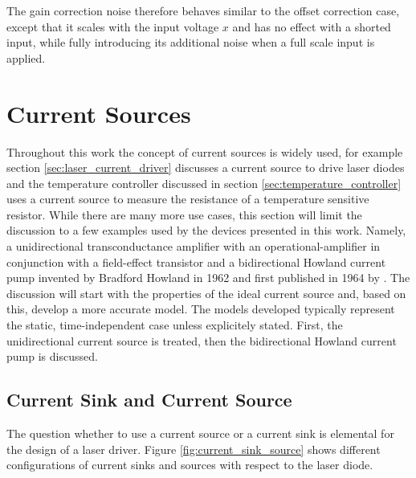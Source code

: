 The gain correction noise therefore behaves similar to the offset correction case, except that it scales with the input voltage $x$ and has no effect with a shorted input, while fully introducing its additional noise when a full scale input is applied.



\clearpage
\section{Current Sources}
Throughout this work the concept of current sources is widely used, for example section \ref{sec:laser_current_driver} discusses a current source to drive laser diodes and the temperature controller discussed in section \ref{sec:temperature_controller} uses a current source to measure the resistance of a temperature sensitive resistor. While there are many more use cases, this section will limit the discussion to a few examples used by the devices presented in this work. Namely, a unidirectional transconductance amplifier with an operational-amplifier in conjunction with a field-effect transistor and a bidirectional Howland current pump invented by Bradford Howland in 1962 and first published in 1964 by \citeauthor{howland_current_source} \cite{howland_current_source}. The discussion will start with the properties of the ideal current source and, based on this, develop a more accurate model. The models developed typically represent the static, time-independent case unless explicitely stated. First, the unidirectional current source is treated, then the bidirectional Howland current pump is discussed.

\subsection{Current Sink and Current Source}%
\label{sec:current_sink_current_source}
The question whether to use a current source or a current sink is elemental for the design of a laser driver. Figure \ref{fig:current_sink_source} shows different configurations of current sinks and sources with respect to the laser diode.


